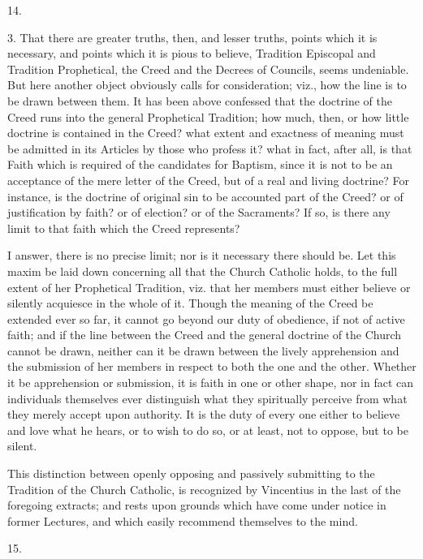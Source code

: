 14.

3. That there are greater truths, then, and lesser truths, points
which it is necessary, and points which it is pious to believe,
Tradition Episcopal and Tradition Prophetical, the Creed and the
Decrees of Councils, seems undeniable. But here another object
obviously calls for consideration; viz., how the line is to be drawn
between them. It has been above confessed that the doctrine of the
Creed runs into the general Prophetical Tradition; how much, then, or
how little doctrine is contained in the Creed? what extent and
exactness of meaning must be admitted in its Articles by those who
profess it? what in fact, after all, is that Faith which is required
of the candidates for Baptism, since it is not to be an acceptance of
the mere letter of the Creed, but of a real and living doctrine? For
instance, is the doctrine of original sin to be accounted part of the
Creed? or of justification by faith? or of election? or of the
Sacraments? If so, is there any limit to that faith which the Creed
represents?

I answer, there is no precise limit; nor is it necessary there
should be. Let this maxim be laid down concerning all that the Church
Catholic holds, to the full extent of her Prophetical Tradition, viz.
that her members must either believe or silently acquiesce in the
whole of it. Though the meaning of the Creed be extended ever so far,
it cannot go beyond our duty of obedience, if not of active faith; and
if the line between the Creed and the general doctrine of the Church
cannot be drawn, neither can it be drawn between the lively
apprehension and the submission of her members in respect to
both the one and the other. Whether it be apprehension or submission,
it is faith in one or other shape, nor in fact can individuals
themselves ever distinguish what they spiritually perceive from what
they merely accept upon authority. It is the duty of every one either
to believe and love what he hears, or to wish to do so, or at least,
not to oppose, but to be silent.

This distinction between openly opposing and passively submitting
to the Tradition of the Church Catholic, is recognized by Vincentius
in the last of the foregoing extracts; and rests upon grounds which
have come under notice in former Lectures, and which easily recommend
themselves to the mind.

15.

